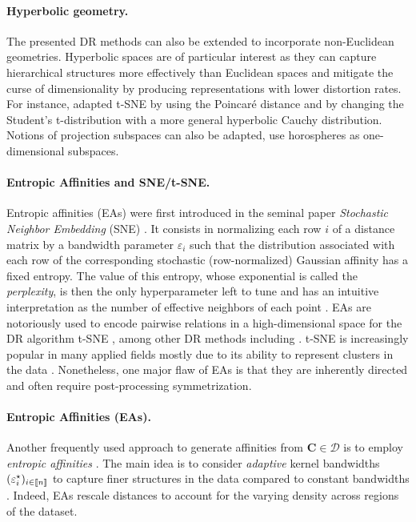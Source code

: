 \paragraph{Hyperbolic geometry.} The presented DR methods can also be extended to incorporate non-Euclidean geometries. Hyperbolic spaces \cite{Chami21, Fan_2022_CVPR, Guo22, Lin23} are of particular interest as they can capture hierarchical structures more effectively than Euclidean spaces and mitigate the curse of dimensionality by producing representations with lower distortion rates. 
For instance, \citet{Guo22} adapted t-SNE by using the Poincaré distance and by changing the Student's t-distribution with a more general hyperbolic Cauchy distribution.  Notions of projection subspaces can also be adapted, \eg \citet{Chami21} use horospheres as one-dimensional subspaces. 


\paragraph{Entropic Affinities and SNE/t-SNE.}
Entropic affinities (EAs) were first introduced in the
seminal paper \emph{Stochastic Neighbor Embedding} (SNE) 
\cite{hinton2002stochastic}. It consists in normalizing each row $i$ of a distance matrix by a
bandwidth parameter $\varepsilon_i$ such that the distribution associated with each row of the corresponding stochastic (\ie row-normalized) Gaussian affinity has a fixed entropy. The value of this entropy, whose exponential is called
the \emph{perplexity}, is then the only hyperparameter left to tune and has
an intuitive interpretation as the number of effective neighbors of each point \cite{vladymyrov2013entropic}.
EAs are notoriously used to encode pairwise relations in a high-dimensional space for the DR algorithm t-SNE \cite{van2008visualizing}, among other DR methods including \cite{carreira2010elastic}. t-SNE is increasingly popular in many applied fields \cite{kobak2019art,
melit2020unsupervised} mostly due to its ability to represent clusters in the data \cite{linderman2019clustering, JMLR:v23:21-0524}. Nonetheless, one major flaw of EAs is that they are inherently directed and often require post-processing symmetrization.

\paragraph{Entropic Affinities (EAs).} Another frequently used approach to generate affinities from $\mathbf{C} \in \mathcal{D}$ is to employ \emph{entropic affinities}  \cite{hinton2002stochastic}. The main idea is to consider \emph{adaptive} kernel bandwidths $(\varepsilon^\star_i)_{i \in {[\![n]\!]}}$ to capture finer structures in the data compared to constant bandwidths \cite{van2018recovering}. Indeed, EAs rescale distances to account for the varying density across regions of the dataset.


